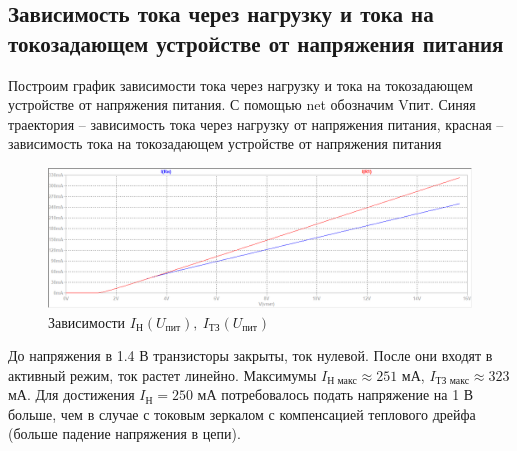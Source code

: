 \documentclass[a4paper, 12pt]{article}
\begin{document}
    \subsection{Зависимость тока через нагрузку и тока на токозадающем устройстве от напряжения питания}
    Построим график зависимости тока через нагрузку и тока на токозадающем устройстве от напряжения питания.
    С помощью net обозначим Vпит. Синяя траектория -- зависимость тока через нагрузку от напряжения питания,
    красная -- зависимость тока на токозадающем устройстве от напряжения питания
    \begin{figure}[H]
        \centering
        \includegraphics[scale=0.46]{2task_Iн(Vпит)_Iтз(Vпит).png}
        \captionsetup{skip=0pt}
        \caption{Зависимости $I_\text{Н}\left( U_\text{пит} \right),\ I_\text{ТЗ}\left( U_\text{пит} \right)$}
        \label{fig:2task_InVl_ItzVl}
    \end{figure}
    \noindent До напряжения в 1.4 В транзисторы закрыты, ток нулевой. После они входят в активный режим,
    ток растет линейно. Максимумы $I_\text{Н макс}\approx251$ мА, $I_\text{ТЗ макс}\approx323$ мА.
    Для достижения $I_\text{Н}=250$ мА потребовалось подать напряжение на 1 В больше, чем в случае
    с токовым зеркалом с компенсацией теплового дрейфа (больше падение напряжения в цепи).
\end{document}
